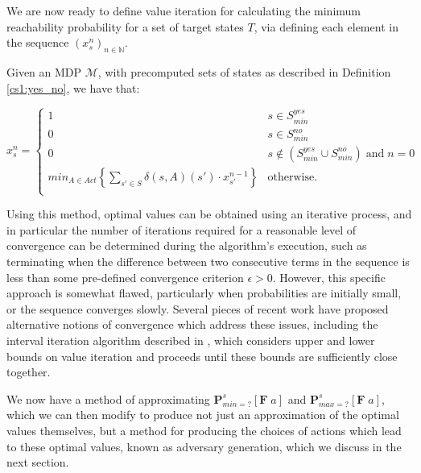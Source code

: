We are now ready to define value iteration for calculating the minimum reachability probability for a set of target states $T$, via defining each element in the sequence $(x^n_s)_{n \in \mathbb{N}}$.

\begin{definition}
\label{cs1:value_iteration}

Given an MDP $\mathcal{M}$, with precomputed sets of states as described in Definition \ref{cs1:yes_no}, we have that:

\begin{equation*}
x^n_s = \begin{cases}
        1 & s \in S^{yes}_{min} \\
        0 & s \in S^{no}_{min} \\
        0 & s \notin (S^{yes}_{min} \cup S^{no}_{min}) \; \text{and} \; n=0 \\
        min_{A \in Act} \left\{ \sum_{s' \in S}\delta(s,A)(s') \cdot x^{n-1}_{s'} \right\} & \text{otherwise.} \\
    \end{cases}
\end{equation*}

\end{definition}

Using this method, optimal values can be obtained using an iterative process, and in particular the number of iterations required for a reasonable level of convergence can be determined during the algorithm's execution, such as terminating when the difference between two consecutive terms in the sequence is less than some pre-defined convergence criterion $\epsilon>0$. However, this specific approach is somewhat flawed, particularly when probabilities are initially small, or the sequence converges slowly. Several pieces of recent work have proposed alternative notions of convergence which address these issues, including the interval iteration algorithm described in \cite{haddad_interval_2018}, which considers upper and lower bounds on value iteration and proceeds until these bounds are sufficiently close together.

We now have a method of approximating $\mathbf{P}^{s}_{min =?} [\mathbf{F} \; a]$ and $\mathbf{P}^{s}_{max =?} [\mathbf{F} \; a]$, which we can then modify to produce not just an approximation of the optimal values themselves, but a method for producing the choices of actions which lead to these optimal values, known as adversary generation, which we discuss in the next section.

